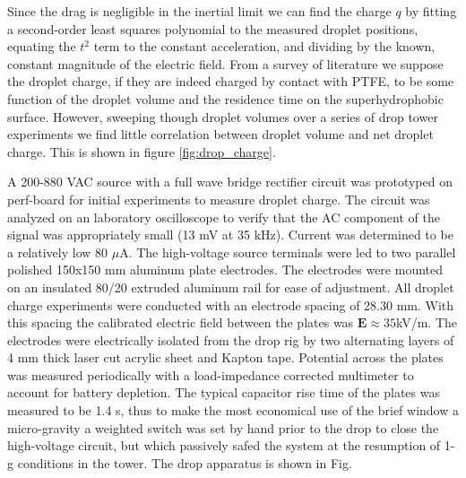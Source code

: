 \documentclass[a4paper, 12pt]{article}
\begin{document}
Since the drag is negligible in the inertial limit we can find the charge $q$ by fitting a second-order least squares polynomial to the measured droplet positions, equating the $t^2$ term to the constant acceleration, and dividing by the known, constant magnitude of the electric field. From a survey of literature we suppose the droplet charge, if they are indeed charged by contact with PTFE, to be some function of the droplet volume and the residence time on the superhydrophobic surface. However, sweeping though droplet volumes over a series of drop tower experiments we find little correlation between droplet volume  and net droplet charge. This is shown in figure \ref{fig:drop_charge}.

A 200-880 VAC source with a full wave bridge rectifier circuit was prototyped on perf-board for initial experiments to measure droplet charge. The circuit was analyzed on an laboratory oscilloscope to verify that the AC component of the signal was appropriately small (13 mV at 35 kHz). Current was determined to be a relatively low 80 $\mu$A. The high-voltage source terminals were led to two parallel polished 150x150 mm aluminum plate electrodes. The electrodes were mounted on an insulated 80/20 extruded aluminum rail for ease of adjustment. All droplet charge experiments were conducted with an electrode spacing of 28.30 mm. With this spacing the calibrated electric field between the plates was $\mathbf{E} \approx 35$kV/m. The electrodes were electrically isolated from the drop rig by two alternating layers of 4 mm thick laser cut acrylic sheet and Kapton tape. Potential across the plates was measured periodically with a load-impedance corrected multimeter to account for battery depletion. The typical capacitor rise time of the plates was measured to be 1.4 s, thus to make the most economical use of the brief window a micro-gravity a weighted switch was set by hand prior to the drop to close the high-voltage circuit, but which passively safed the system at the resumption of 1-g conditions in the tower. The drop apparatus is shown in Fig.



\end{document}
